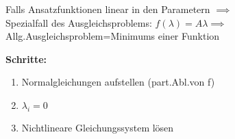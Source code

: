 \documentclass[../ZF_HM2.tex]{subfiles}
\begin{document}
Falls Ansatzfunktionen linear in den Parametern $\implies$\\ Spezialfall des Ausgleichsproblems: $f(\lambda)= A \lambda \implies$ \colorbox{orange!30}{Allg.Ausgleichsproblem}=\colorbox{violet!30}{Minimums einer Funktion}

\begin{mdframed}
	\textbf{Schritte:\\}
	\begin{enumerate}
		\item Normalgleichungen aufstellen (part.Abl.von f)
		\item $\lambda_i =0$
		\item Nichtlineare Gleichungssystem lösen
	\end{enumerate}
	
	
\end{mdframed}
\end{document}

